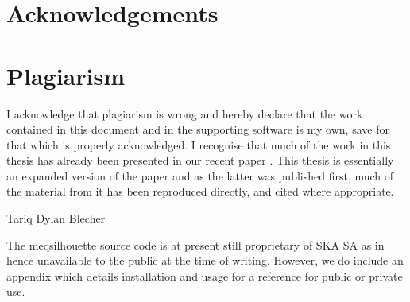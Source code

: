
 
\chapter*{Acknowledgements}
 
\chapter*{Plagiarism}
 I acknowledge that plagiarism is wrong and hereby declare that the work contained in this document and in the supporting software is my own, save for that which is properly acknowledged. I recognise that much of the work in this thesis has already been presented in our recent paper \citet{Blecher_2016}. This thesis is essentially an expanded version of the paper and as the latter was published first, much of the material from it has been reproduced directly, and cited where appropriate. 
 \vspace{55pt}
 
Tariq Dylan Blecher
 \clearpage
  \vspace*{\fill}
    \begin{center}
     \huge
     The {\sc meqsilhouette} source code is at present still proprietary of SKA SA as in hence unavailable to the public at the time of writing. However, we do include an appendix which details installation and usage for a reference for public or private use.
    \end{center}
  \vspace*{\fill}
 \clearpage
{\let\clearpage\relax \tableofcontents \listoffigures \listoftables}